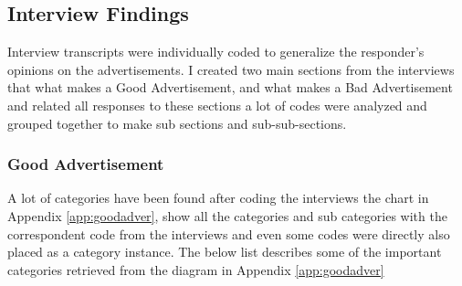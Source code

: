 \subsection{Interview Findings}
Interview transcripts were individually coded to generalize the responder's opinions on the advertisements. I created two main sections from the interviews that what makes a Good Advertisement, and what makes a Bad Advertisement and related all responses to these sections a lot of codes were analyzed and grouped together to make sub sections and sub-sub-sections.

\subsubsection{Good Advertisement}
A lot of categories have been found after coding the interviews the chart in Appendix \ref{app:goodadver}, show all the categories and sub categories with the correspondent code from the interviews and even some codes were directly also placed as a category instance. The below list describes some of the important categories retrieved from the diagram in Appendix \ref{app:goodadver}

